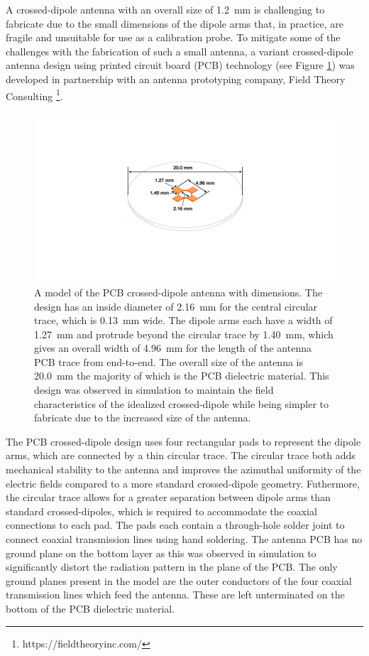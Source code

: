 A crossed-dipole antenna with an overall size of 1.2~mm is challenging to fabricate due to the small dimensions of the dipole arms that, in practice, are fragile and unsuitable for use as a calibration probe. To mitigate some of the challenges with the fabrication of such a small antenna, a variant crossed-dipole antenna design using printed circuit board (PCB) technology (see Figure \ref{fig:cross-dipole-pcb-model}) was developed in partnership with an antenna prototyping company, Field Theory Consulting \footnote{https://fieldtheoryinc.com/}. 
\begin{figure}[h]
\centering
\includegraphics[width=.5\textwidth]{figs/Chapter-5/221101_cres_asbuilt_dims.pdf}
\qquad
\caption{\label{fig:cross-dipole-pcb-model} A model of the PCB crossed-dipole antenna with dimensions. The design has an inside diameter of 2.16~mm for the central circular trace, which is 0.13~mm wide. The dipole arms each have a width of 1.27~mm and protrude beyond the circular trace by 1.40~mm, which gives an overall width of 4.96~mm for the length of the antenna PCB trace from end-to-end. The overall size of the antenna is 20.0~mm the majority of which is the PCB dielectric material. This design was observed in simulation to maintain the field characteristics of the idealized crossed-dipole while being simpler to fabricate due to the increased size of the antenna.}
\end{figure}

The PCB crossed-dipole design uses four rectangular pads to represent the dipole arms, which are connected by a thin circular trace. The circular trace both adds mechanical stability to the antenna and improves the azimuthal uniformity of the electric fields compared to a more standard crossed-dipole geometry. Futhermore, the circular trace allows for a greater separation between dipole arms than standard crossed-dipoles, which is required to accommodate the coaxial connections to each pad. The pads each contain a through-hole solder joint to connect coaxial transmission lines using hand soldering. The antenna PCB has no ground plane on the bottom layer as this was observed in simulation to significantly distort the radiation pattern in the plane of the PCB. The only ground planes present in the model are the outer conductors of the four coaxial transmission lines which feed the antenna. These are left unterminated on the bottom of the PCB dielectric material.

